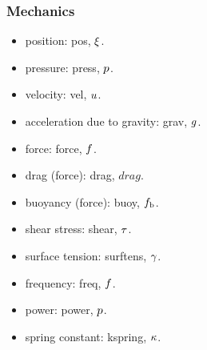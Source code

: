 \subsubsection{Mechanics}
\begin{itemize}
\item position: pos, $\xi$.
\item pressure: press, $p$.
\item velocity: vel, $u$.
\item acceleration due to gravity: grav, $g$.
\item force: force, $f$.
\item drag (force): drag, $drag$.
\item buoyancy (force): buoy, $f_\text{b}$.
\item shear stress: shear, $\tau$.
\item surface tension: surftens, $\gamma$.
\item frequency: freq, $f$.
\item power: power, $p$.
\item spring constant: kspring, $\kappa$.
\end{itemize}


